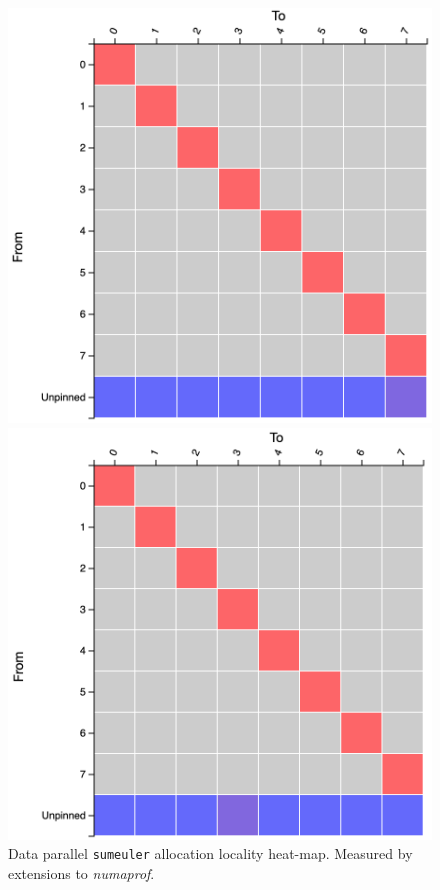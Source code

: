 \documentclass{paper}\usepackage{graphicx}
\begin{document}
\begin{figure}[!htb]
    \centering
    \begin{multicols}{3}
    \caption{DNC \lstinline{sumeuler} allocation locality heat-map. Measured by extensions to \textit{numaprof}.}
    \label{fig:divconq_alloc}
    \includegraphics[width=\linewidth]{Paper/images/sumeuler/divconq_alloc.png}\par
    \caption{Data parallel \lstinline{sumeuler} allocation locality heat-map. Measured by extensions to \textit{numaprof}.}
    \includegraphics[width=\linewidth]{Paper/images/sumeuler/dp_alloc.png}\par

\end{multicols}
\end{figure}
\end{document}
